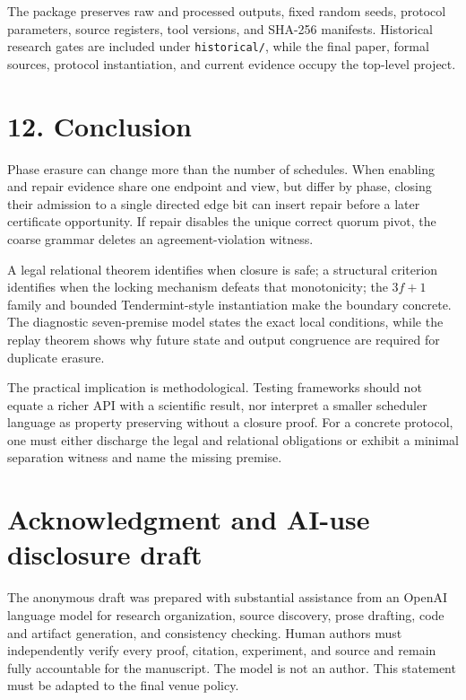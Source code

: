 The package preserves raw and processed outputs, fixed random seeds,
protocol parameters, source registers, tool versions, and SHA-256
manifests. Historical research gates are included under
\texttt{historical/}, while the final paper, formal sources, protocol
instantiation, and current evidence occupy the top-level project.

\section{12. Conclusion}\label{conclusion}

Phase erasure can change more than the number of schedules. When
enabling and repair evidence share one endpoint and view, but differ by
phase, closing their admission to a single directed edge bit can insert
repair before a later certificate opportunity. If repair disables the
unique correct quorum pivot, the coarse grammar deletes an
agreement-violation witness.

A legal relational theorem identifies when closure is safe; a structural
criterion identifies when the locking mechanism defeats that
monotonicity; the \(3f+1\) family and bounded Tendermint-style
instantiation make the boundary concrete. The diagnostic seven-premise
model states the exact local conditions, while the replay theorem shows
why future state and output congruence are required for duplicate
erasure.

The practical implication is methodological. Testing frameworks should
not equate a richer API with a scientific result, nor interpret a
smaller scheduler language as property preserving without a closure
proof. For a concrete protocol, one must either discharge the legal and
relational obligations or exhibit a minimal separation witness and name
the missing premise.

\section{Acknowledgment and AI-use disclosure
draft}\label{acknowledgment-and-ai-use-disclosure-draft}

The anonymous draft was prepared with substantial assistance from an
OpenAI language model for research organization, source discovery, prose
drafting, code and artifact generation, and consistency checking. Human
authors must independently verify every proof, citation, experiment, and
source and remain fully accountable for the manuscript. The model is not
an author. This statement must be adapted to the final venue policy.
